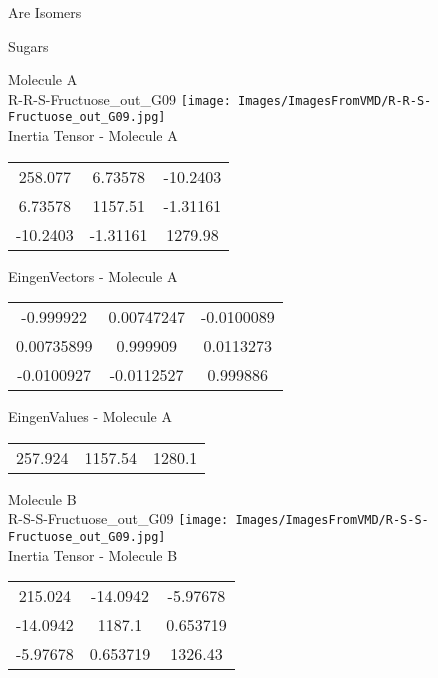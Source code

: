\begin{center}
\vtab
\vtab
\textcolor{NavyBlue}{\Large Are Isomers}
\end{center}
\newpage

\vtab[-2cm]
\begin{center}
{\large Sugars}
\end{center}
\begin{multicols}{2}
\begin{center}
Molecule A \\ 
R-R-S-Fructuose\_out\_G09
\texttt{[image: Images/ImagesFromVMD/R-R-S-Fructuose\_out\_G09.jpg]}
\\
Inertia Tensor - Molecule A \\
\vtab
\begin{tabular}{|c c c|}
258.077	 & 	6.73578	 & 	-10.2403	 \\
6.73578	 & 	1157.51	 & 	-1.31161	 \\
-10.2403	 & 	-1.31161	 & 	1279.98
\end{tabular}

\vtab
 EingenVectors - Molecule A     \\
\vtab
\begin{tabular}{|c c c|}
-0.999922	 & 	0.00747247	 & 	-0.0100089	 \\
0.00735899	 & 	0.999909	 & 	0.0113273	 \\
-0.0100927	 & 	-0.0112527	 & 	0.999886
\end{tabular}

\vtab
 EingenValues - Molecule A     \\
\vtab
\begin{tabular}{|c c c|}
257.924	 & 	1157.54	 & 	1280.1
\end{tabular}
\columnbreak

Molecule B \\ 
R-S-S-Fructuose\_out\_G09
\texttt{[image: Images/ImagesFromVMD/R-S-S-Fructuose\_out\_G09.jpg]}
\\
Inertia Tensor - Molecule B \\
\vtab
\begin{tabular}{|c c c|}
215.024	 & 	-14.0942	 & 	-5.97678	 \\
-14.0942	 & 	1187.1	 & 	0.653719	 \\
-5.97678	 & 	0.653719	 & 	1326.43
\end{tabular}


\end{center}
\end{multicols}
